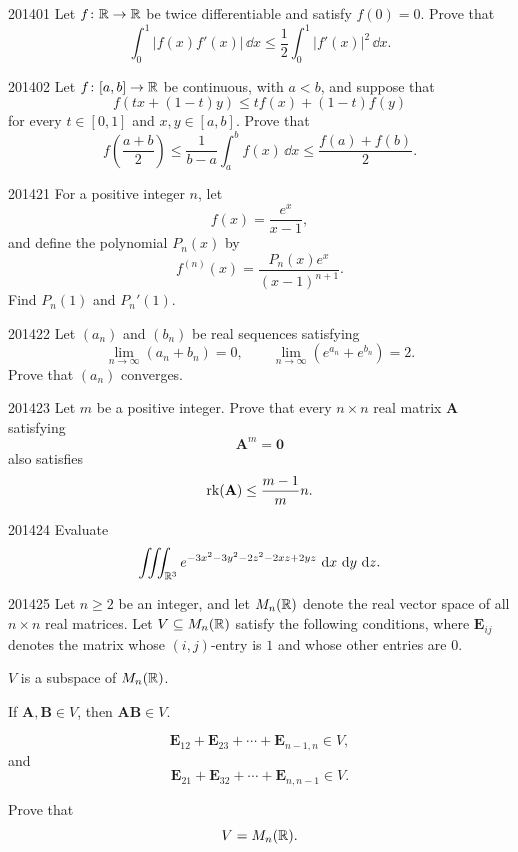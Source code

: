 
\begin{problem}{2014}{0}{1}
Let $f\colon\mathbb{R}\to\mathbb{R}$ be twice differentiable and satisfy $f(0)=0$. Prove that
\[
    \int_0^1|f(x)f'(x)|\, \dd x
    \le
    \frac12\int_0^1|f'(x)|^2\, \dd x.
\]
\end{problem}

\begin{problem}{2014}{0}{2}
Let $f\colon[a, b]\to\mathbb{R}$ be continuous, with $a<b$, and suppose that
\[
    f(tx+(1-t)y)
    \le
    tf(x)+(1-t)f(y)
\]
for every $t\in[0, 1]$ and $x, y\in[a, b]$. Prove that
\[
    f\!\left(\frac{a+b}{2}\right)
    \le
    \frac1{b-a}\int_a^b f(x)\, \dd x
    \le
    \frac{f(a)+f(b)}2.
\]
\end{problem}

\begin{problem}{2014}{2}{1}
For a positive integer $n$, let
\[
    f(x)=\frac{e^x}{x-1},
\]
and define the polynomial $P_n(x)$ by
\[
    f^{(n)}(x)=\frac{P_n(x)e^x}{(x-1)^{n+1}}.
\]
Find $P_n(1)$ and $P_n'(1)$.
\end{problem}

\begin{problem}{2014}{2}{2}
Let $(a_n)$ and $(b_n)$ be real sequences satisfying
\[
    \lim_{n\to\infty}(a_n+b_n)=0,
    \qquad
    \lim_{n\to\infty}(e^{a_n}+e^{b_n})=2.
\]
Prove that $(a_n)$ converges.
\end{problem}

\begin{problem}{2014}{2}{3}
Let $m$ be a positive integer. Prove that every $n\times n$ real matrix $\mathbf A$ satisfying
\[
    \mathbf A^m=\mathbf0
\]
also satisfies
\[
    \operatorname{rk}(\mathbf A)
    \le
    \frac{m-1}{m}n.
\]
\end{problem}

\begin{problem}{2014}{2}{4}
Evaluate
\[
    \iiint_{\mathbb{R}^3}
    e^{-3x^2-3y^2-2z^2-2xz+2yz}
    \, \mathop{}\!\mathrm{d} x\, \mathop{}\!\mathrm{d} y\, \mathop{}\!\mathrm{d} z.
\]
\end{problem}

\begin{problem}{2014}{2}{5}
Let $n\ge2$ be an integer, and let $M_n(\mathbb{R})$ denote the real vector space of all $n\times n$ real matrices. Let $V\subseteq M_n(\mathbb{R})$ satisfy the following conditions, where $\mathbf E_{ij}$ denotes the matrix whose $(i, j)$-entry is $1$ and whose other entries are $0$.
\begin{problemclauses}
    \item $V$ is a subspace of $M_n(\mathbb{R})$.
    \item If $\mathbf A, \mathbf B\in V$, then $\mathbf A\mathbf B\in V$.
    \item
    \[
        \mathbf E_{12}+\mathbf E_{23}+\cdots+\mathbf E_{n-1, n}\in V,
    \]
    and
    \[
        \mathbf E_{21}+\mathbf E_{32}+\cdots+\mathbf E_{n, n-1}\in V.
    \]
\end{problemclauses}
Prove that
\[
    V=M_n(\mathbb{R}).
\]
\end{problem}

